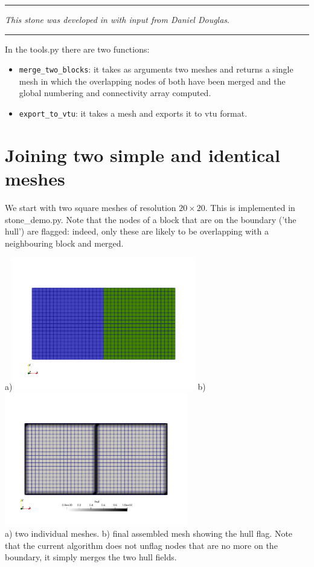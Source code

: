 \par\noindent\rule{\textwidth}{0.4pt}

{\sl This stone was developed in with input from Daniel Douglas}. 

\par\noindent\rule{\textwidth}{0.4pt}


In the {\pythonfile tools.py} there are two functions:
\begin{itemize}
\item \verb'merge_two_blocks': it takes as arguments two meshes and returns a single mesh in which 
the overlapping nodes of both have been merged and the global numbering and connectivity array computed.
\item \verb'export_to_vtu': it takes a mesh and exports it to vtu format.
\end{itemize}

\section*{Joining two simple and identical meshes}

We start with two square meshes of resolution $20 \times 20$. This is implemented 
in {\pythonfile stone\_demo.py}. Note that the nodes of a block that are on the boundary 
('the hull') are flagged: indeed, only these are likely to be overlapping with a neighbouring 
block and merged.

\begin{center}
a)\includegraphics[width=8cm]{python_codes/fieldstone_149/results/one}
b)\includegraphics[width=8cm]{python_codes/fieldstone_149/results/two}\\
{\captionfont a) two individual meshes. b) final assembled mesh showing the hull flag. Note that the current algorithm does 
not unflag nodes that are no more on the boundary, it simply merges the two hull fields.}
\end{center}


